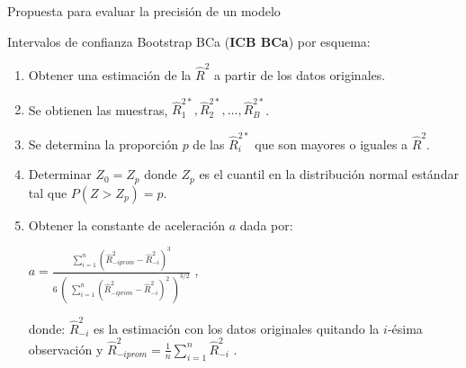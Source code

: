 \documentclass[serif, aspectratio=169]{beamer}
\begin{document}
\begin{frame}{Propuesta para evaluar la precisión de un modelo}
	

	Intervalos de confianza Bootstrap BCa (\textbf{ICB BCa}) por esquema:

\begin{enumerate}
\item Obtener una estimación de la $\hat{R}^2$ a partir de los datos originales.

\item Se obtienen las muestras, $\hat{R}^{2*}_{1} , \hat{R}^{2*}_{2}, \dots,\hat{R}^{2*}_{B}$.

\item Se determina la proporción $p$ de las $\hat{R}^{2*}_{i}$ que son mayores o iguales a $\hat{R}^2$.

\item  Determinar $Z_{0} = Z_{p}$ donde $Z_{p}$ es el cuantil en la distribución normal estándar tal que $P(Z > Z_{p}) = p$.

\item  Obtener la constante de aceleración $a$ dada por:
\begin{center}
	\Large $ a = \frac{\sum_{i=1}^{n}  (\hat{R}^{2}_{-iprom}  - \hat{R}^{2}_{-i})^{3} }{ 6 \; (\; \sum_{i=1}^{n}  ( \hat{R}^{2}_{-iprom}  - \hat{R}^{2}_{-i})^{2} \; )^{3/2}} $ ,
\end{center}

donde: $\hat{R}^{2}_{-i}$ es la estimación con los datos originales quitando la $i$-ésima observación y {\normalsize $\hat{R}^{2}_{-iprom} = \frac{1}{n} \sum_{i=1}^{n}\hat{R}^{2}_{-i}$} .
\end{enumerate}
\end{frame}
\end{document}
